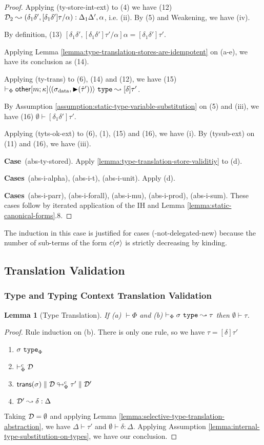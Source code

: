 \documentclass[12pt]{article}
\newtheorem{lemma}{Lemma}
\newcommand{\pfcase}[1]{\textbf{Case}~#1. }
\newcommand{\pfcases}[1]{\textbf{Cases}~#1. }
\begin{document}
\begin{proof}
Applying (ty-store-int-ext) to (4) we have (12) $\mathcal{D}_2 \leadsto (\delta_1\delta', [\delta_1\delta']\tau/\alpha) : \Delta_1\Delta', \alpha$, i.e. (ii). By (5) and Weakening, we have (iv).

By definition, (13) $[\delta_1\delta', [\delta_1\delta']\tau'/\alpha]\alpha=[\delta_1\delta']\tau'$.

Applying Lemma \ref{lemma:type-translation-stores-are-idempotent} on (a-e), we have its conclusion as (14).


Applying (ty-trans) to (6), (14) and (12), we have (15) $\vdash_{\Phi} {{\sf other}[m; \kappa]}\langle(\sigma_\text{data}, {\blacktriangleright}(\hat{\tau}'))\rangle~\mathtt{type} \leadsto [\delta]\tau'$. 

By Assumption \ref{assumption:static-type-variable-substitution} on (5) and (iii), we have (16) $\emptyset \vdash [\delta_1\delta']\tau'$.

Applying (tyts-ok-ext) to (6), (1), (15) and (16), we have (i). By (tysub-ext) on (11) and (16), we have (iii).

\pfcase{(abs-ty-stored)} Apply \ref{lemma:type-translation-store-validitiy} to (d).

\pfcases{(abs-i-alpha), (abs-i-t), (abs-i-unit)} Apply (d).

\pfcases{(abs-i-parr), (abs-i-forall), (abs-i-mu), (abs-i-prod), (abs-i-sum)} These cases follow by iterated application of the IH and Lemma \ref{lemma:static-canonical-forms}.8.
\end{proof}

The induction in this case is justified for cases (-not-delegated-new) because the number of sub-terms of the form ${c}\langle\sigma\rangle$ is strictly decreasing by kinding.

\subsection{Translation Validation}
\subsubsection{Type and Typing Context Translation Validation}
\begin{lemma}[Type Translation]
\label{lemma:type-translation}
If (a) $\vdash \Phi$ and (b) $\vdash_{\Phi} \sigma~\mathtt{type} \leadsto \tau$ then $\emptyset \vdash \tau$.
\end{lemma}
\begin{proof} Rule induction on (b). There is only one rule, so we have $\tau=[\delta]\tau'$ \begin{enumerate}[(1)]
\item $\sigma~\mathtt{type}_{\Phi}$
\item $\vdash_{\Phi}^{c} \mathcal{D}$
\item ${\sf trans}(\sigma) \parallel \mathcal{D} \looparrowright_{\Phi}^{c} \tau' \parallel \mathcal{D}'$
\item $\mathcal{D}' \leadsto \delta : \Delta$
\end{enumerate}
Taking $\mathcal{D}=\emptyset$ and applying Lemma \ref{lemma:selective-type-translation-abstraction}, we have $\Delta \vdash \tau'$ and $\emptyset \vdash \delta : \Delta$. Applying Assumption \ref{lemma:internal-type-substitution-on-types}, we have our conclusion.
\end{proof}
\end{document}
